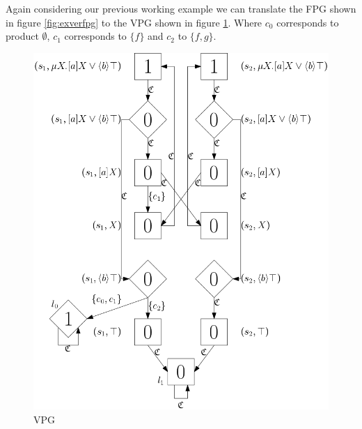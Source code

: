 Again considering our previous working example we can translate the FPG shown in figure \ref{fig:exverfpg} to the VPG shown in figure \ref{fig:exvevpg}. Where $c_0$ corresponds to product $\emptyset$, $c_1$ corresponds to $\{f\}$ and $c_2$ to $\{f,g\}$.
\begin{figure}[h]
	\centering
	\includegraphics[scale=0.3]{Examples/ExamleVerification/VPG}
	\caption[VPG]{VPG}
	\label{fig:exvevpg}
\end{figure}

